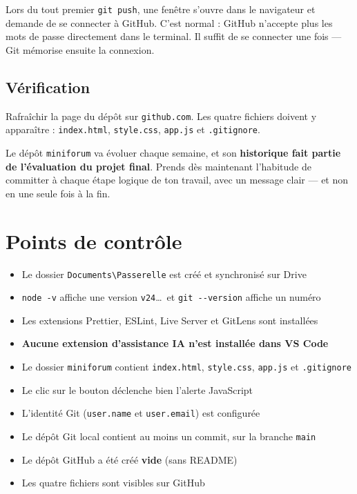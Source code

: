 \documentclass[a4paper,11pt]{article}
\begin{document}
\begin{tcolorbox}[astuce, title={Authentification}]
Lors du tout premier \texttt{git push}, une fenêtre s'ouvre dans le navigateur et demande de se connecter à GitHub. C'est normal : GitHub n'accepte plus les mots de passe directement dans le terminal. Il suffit de se connecter une fois --- Git mémorise ensuite la connexion.
\end{tcolorbox}

\subsection{Vérification}

Rafraîchir la page du dépôt sur \texttt{github.com}. Les quatre fichiers doivent y apparaître : \texttt{index.html}, \texttt{style.css}, \texttt{app.js} et \texttt{.gitignore}.

\begin{tcolorbox}[definition, title={Pour la suite du cours}]
Le dépôt \texttt{miniforum} va évoluer chaque semaine, et son \textbf{historique fait partie de l'évaluation du projet final}. Prends dès maintenant l'habitude de committer à chaque étape logique de ton travail, avec un message clair --- et non en une seule fois à la fin.
\end{tcolorbox}

\section{Points de contrôle}

\begin{tcolorbox}[definition, title={Auto-évaluation}]
\begin{itemize}
  \item[$\square$] Le dossier \texttt{Documents\textbackslash Passerelle} est créé et synchronisé sur Drive
  \item[$\square$] \texttt{node -v} affiche une version \texttt{v24}\ldots\ et \texttt{git -{}-version} affiche un numéro
  \item[$\square$] Les extensions Prettier, ESLint, Live Server et GitLens sont installées
  \item[$\square$] \textbf{Aucune extension d'assistance IA n'est installée dans VS Code}
  \item[$\square$] Le dossier \texttt{miniforum} contient \texttt{index.html}, \texttt{style.css}, \texttt{app.js} et \texttt{.gitignore}
  \item[$\square$] Le clic sur le bouton déclenche bien l'alerte JavaScript
  \item[$\square$] L'identité Git (\texttt{user.name} et \texttt{user.email}) est configurée
  \item[$\square$] Le dépôt Git local contient au moins un commit, sur la branche \texttt{main}
  \item[$\square$] Le dépôt GitHub a été créé \textbf{vide} (sans README)
  \item[$\square$] Les quatre fichiers sont visibles sur GitHub
\end{itemize}
\end{tcolorbox}
\end{document}
